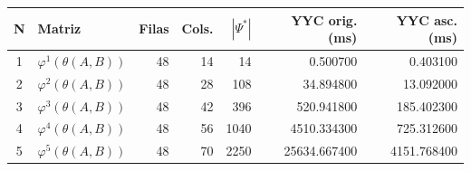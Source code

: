 \begin{tabular}{c l r r r r r}
\toprule
N & Matriz & Filas & Cols. & $|\Psi^*|$ & YYC orig. (ms) & YYC asc. (ms) \\
\midrule
1 & $\varphi^{1}(\theta(A,B))$ & 48 & 14 & 14 & 0.500700 & 0.403100 \\
2 & $\varphi^{2}(\theta(A,B))$ & 48 & 28 & 108 & 34.894800 & 13.092000 \\
3 & $\varphi^{3}(\theta(A,B))$ & 48 & 42 & 396 & 520.941800 & 185.402300 \\
4 & $\varphi^{4}(\theta(A,B))$ & 48 & 56 & 1040 & 4510.334300 & 725.312600 \\
5 & $\varphi^{5}(\theta(A,B))$ & 48 & 70 & 2250 & 25634.667400 & 4151.768400 \\
\bottomrule
\end{tabular}
